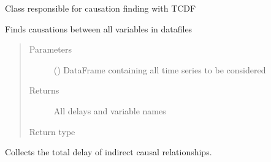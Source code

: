 \documentclass[letterpaper,10pt,english]{sphinxmanual}
\begin{document}
\begin{fulllineitems}
\label{\detokenize{causations:causations.Causations}}
\sphinxAtStartPar
Class responsible for causation finding with TCDF

\begin{fulllineitems}
\label{\detokenize{causations:causations.Causations.get_causation}}
\sphinxAtStartPar
Finds causations between all variables in datafiles
\begin{quote}\begin{description}
\item[{Parameters}] \leavevmode
\sphinxAtStartPar
{} () \textendash{} DataFrame containing all time series to be considered

\item[{Returns}] \leavevmode
\sphinxAtStartPar
All delays and variable names

\item[{Return type}] \leavevmode
\sphinxAtStartPar
{}

\end{description}\end{quote}

\end{fulllineitems}


\begin{fulllineitems}
\label{\detokenize{causations:causations.Causations.getextendeddelays}}
\sphinxAtStartPar
Collects the total delay of indirect causal relationships.

\end{fulllineitems}



\end{fulllineitems}
\end{document}

